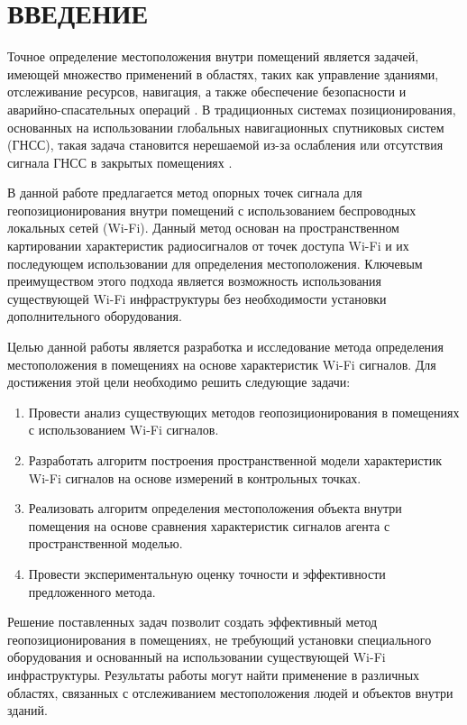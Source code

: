 \chapter*{ВВЕДЕНИЕ}

Точное определение местоположения внутри помещений является задачей, имеющей множество применений в областях, таких как управление зданиями, отслеживание ресурсов, навигация, а также обеспечение безопасности и аварийно-спасательных операций \cite{basebook}. В традиционных системах позиционирования, основанных на использовании глобальных навигационных спутниковых систем (ГНСС), такая задача становится нерешаемой из-за ослабления или отсутствия сигнала ГНСС в закрытых помещениях \cite{GPSdrawbacks}.

В данной работе предлагается метод опорных точек сигнала для геопозиционирования внутри помещений с использованием беспроводных локальных сетей (Wi-Fi). Данный метод основан на пространственном картировании характеристик радиосигналов от точек доступа Wi-Fi и их последующем использовании для определения местоположения. Ключевым преимуществом этого подхода является возможность использования существующей Wi-Fi инфраструктуры без необходимости установки дополнительного оборудования.

Целью данной работы является разработка и исследование метода определения местоположения в помещениях на основе характеристик Wi-Fi сигналов. Для достижения этой цели необходимо решить следующие задачи:

\begin{enumerate}
    \item Провести анализ существующих методов геопозиционирования в помещениях с использованием Wi-Fi сигналов.
    \item Разработать алгоритм построения пространственной модели характеристик Wi-Fi сигналов на основе измерений в контрольных точках.
    \item Реализовать алгоритм определения местоположения объекта внутри помещения на основе сравнения характеристик сигналов агента с пространственной моделью.
    \item Провести экспериментальную оценку точности и эффективности предложенного метода.
\end{enumerate}

Решение поставленных задач позволит создать эффективный метод геопозиционирования в помещениях, не требующий установки специального оборудования и основанный на использовании существующей Wi-Fi инфраструктуры. Результаты работы могут найти применение в различных областях, связанных с отслеживанием местоположения людей и объектов внутри зданий.
